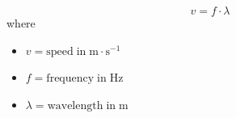     \begin{equation}
    v=f\ensuremath{\cdot}\lambda \tag{8.3}
      \end{equation}
        \label{m38782*id292818}where
\label{m38782*eip-id1170811315120}\begin{itemize}[noitemsep]
            \item $v=\mathrm{speed\; in\; m}\ensuremath{\cdot}\mathrm{s}{}^{-1}$\item $f=\mathrm{frequency\; in\; Hz}$\item $\lambda =\mathrm{wavelength\; in\; m}$\end{itemize}
        \par 
\par
            \label{m38782*secfhsst!!!underscore!!!id196}\vspace{.5cm} 
      \pagebreak
